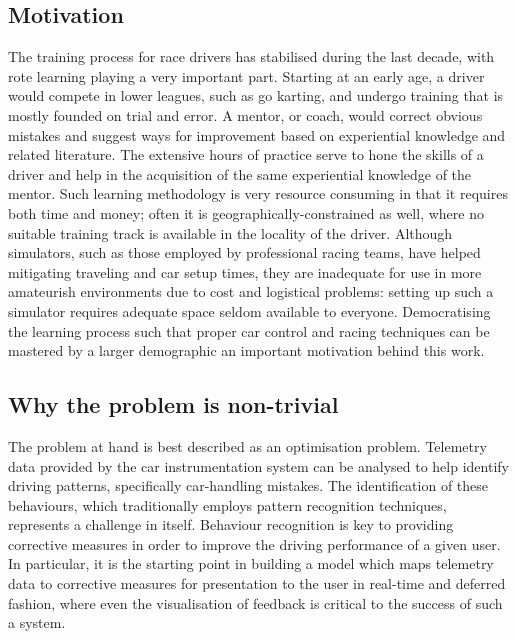 \subsection{Motivation}
The training process for race drivers has stabilised during the last decade, with rote learning playing a very important part. Starting at an early age, a driver would compete in lower leagues, such as go karting, and undergo training that is mostly founded on trial and error. A mentor, or coach, would correct obvious mistakes and suggest ways for improvement based on experiential knowledge and related literature. The extensive hours of practice serve to hone the skills of a driver and help in the acquisition of the same experiential knowledge of the mentor. Such learning methodology is very resource consuming in that it requires both time and money; often it is geographically-constrained as well, where no suitable training track is available in the locality of the driver. Although simulators, such as those employed by professional racing teams, have helped mitigating traveling and car setup times, they are inadequate for use in more amateurish environments due to cost and logistical problems: setting up such a simulator requires adequate space seldom available to everyone. Democratising the learning process such that proper car control and racing techniques can be mastered by a larger demographic an important motivation behind this work.

\subsection{Why the problem is non-trivial}
The problem at hand is best described as an optimisation problem. Telemetry data provided by the car instrumentation system can be analysed to help identify driving patterns, specifically car-handling mistakes. The identification of these behaviours, which traditionally employs pattern recognition techniques, represents a challenge in itself. Behaviour recognition is key to providing corrective measures in order to improve the driving performance of a given user. In particular, it is the starting point in building a model which maps telemetry data to corrective measures for presentation to the user in real-time and deferred fashion, where even the visualisation of feedback is critical to the success of such a system.
